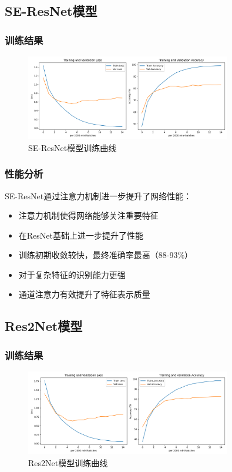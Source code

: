 \documentclass[12pt,a4paper]{article}
\begin{document}
\subsection{SE-ResNet模型}
\subsubsection{训练结果}
\begin{figure}[H]
\centering
\includegraphics[width=0.8\textwidth]{../image/training_curves_seresnet.png}
\caption{SE-ResNet模型训练曲线}
\label{fig:seresnet_curves}
\end{figure}

\subsubsection{性能分析}
SE-ResNet通过注意力机制进一步提升了网络性能：
\begin{itemize}
    \item 注意力机制使得网络能够关注重要特征
    \item 在ResNet基础上进一步提升了性能
    \item 训练初期收敛较快，最终准确率最高（88-93\%）
    \item 对于复杂特征的识别能力更强
    \item 通道注意力有效提升了特征表示质量
\end{itemize}

\subsection{Res2Net模型}
\subsubsection{训练结果}
\begin{figure}[H]
\centering
\includegraphics[width=0.8\textwidth]{../image/training_curves_res2net.png}
\caption{Res2Net模型训练曲线}
\label{fig:res2net_curves}
\end{figure}
\end{document}
